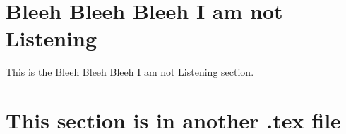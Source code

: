\documentclass[]{article}
\theoremstyle{definition}
\numberwithin{equation}{subsection}
\begin{document}
        

\appendix
\section{Bleeh Bleeh Bleeh I am not Listening}
    This is the Bleeh Bleeh Bleeh I am not Listening section. 

\section{This section is in another .tex file} 
    





\end{document}
